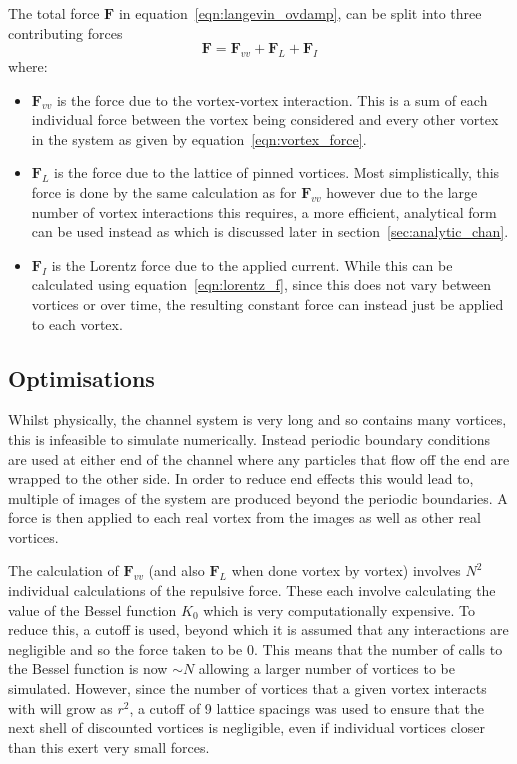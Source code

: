 \documentclass{article}
\numberwithin{equation}{section}
\begin{document}
The total force $\mathbf{F}$ in equation~\ref{eqn:langevin_ovdamp}, can be split into three contributing forces
\begin{equation}
    \mathbf{F} = \mathbf{F}_{vv} + \mathbf{F}_L + \mathbf{F}_I
\end{equation}
where:
\begin{itemize}
    \item $\mathbf{F}_{vv}$ is the force due to the vortex-vortex interaction. This is a sum of each individual force between the vortex being considered and every other vortex in the system as given by equation~\ref{eqn:vortex_force}.
    \item $\mathbf{F}_L$ is the force due to the lattice of pinned vortices. Most simplistically, this force is done by the same calculation as for $\mathbf{F}_{vv}$ however due to the large number of vortex interactions this requires, a more efficient, analytical form can be used instead as which is discussed later in section~\ref{sec:analytic_chan}.
    \item $\mathbf{F}_I$ is the Lorentz force due to the applied current. While this can be calculated using equation~\ref{eqn:lorentz_f}, since this does not vary between vortices or over time, the resulting constant force can instead just be applied to each vortex.
\end{itemize}

\subsection{Optimisations}
Whilst physically, the channel system is very long and so contains many vortices, this is infeasible to simulate numerically. Instead periodic boundary conditions are used at either end of the channel where any particles that flow off the end are wrapped to the other side. In order to reduce end effects this would lead to, multiple of images of the system are produced beyond the periodic boundaries. A force is then applied to each real vortex from the images as well as other real vortices.

The calculation of $\mathbf{F}_{vv}$ (and also $\mathbf{F}_L$ when done vortex by vortex) involves $N^2$ individual calculations of the repulsive force. These each involve calculating the value of the Bessel function $K_0$ which is very computationally expensive. To reduce this, a cutoff is used, beyond which it is assumed that any interactions are negligible and so the force taken to be 0. This means that the number of calls to the Bessel function is now $\sim N$ allowing a larger number of vortices to be simulated. However, since the number of vortices that a given vortex interacts with will grow as $r^2$, a cutoff of 9 lattice spacings was used to ensure that the next shell of discounted vortices is negligible, even if individual vortices closer than this exert very small forces.
\end{document}
